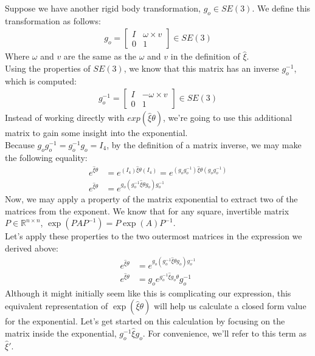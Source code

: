\documentclass[oneside]{book}
\begin{document}
Suppose we have another rigid body transformation, $g_o \in SE(3)$. We define this transformation as follows:
\begin{align}
    g_o = 
    \begin{bmatrix}
    I & \omega\times v\\
    0 & 1
    \end{bmatrix} \in SE(3)
\end{align}
Where $\omega$ and $v$ are the same as the $\omega$ and $v$ in the definition of $\hat\xi$.\\
Using the properties of $SE(3)$, we know that this matrix has an inverse $g_o^{-1}$, which is computed:
\begin{align}
    g_o^{-1} = 
    \begin{bmatrix}
    I & -\omega\times v\\
    0 & 1
    \end{bmatrix} \in SE(3)
\end{align}
Instead of working directly with $exp(\hat\xi\theta)$, we're going to use this additional matrix to gain some insight into the exponential.\\
Because $g_o g_o^{-1} = g_o^{-1}g_o = I_4$, by the definition of a matrix inverse, we may make the following equality:
\begin{align}
    e^{\hat\xi\theta} &= e^{(I_4) \hat\xi\theta (I_4)} = e^{(g_o g_o^{-1}) \hat\xi\theta (g_o g_o^{-1})}\\
    e^{\hat\xi\theta} &= e^{g_o (g_o^{-1} \hat\xi\theta g_o) g_o^{-1}}
\end{align}
Now, we may apply a property of the matrix exponential to extract two of the matrices from the exponent. We know that for any square, invertible matrix $P \in \mathbb{R}^{n\times n}$, $\exp(PAP^{-1}) = P\exp(A)P^{-1}$.\\
Let's apply these properties to the two outermost matrices in the expression we derived above:
\begin{align}
    e^{\hat\xi\theta} &= e^{g_o (g_o^{-1} \hat\xi\theta g_o) g_o^{-1}}\\
    e^{\hat\xi\theta} &= g_o e^{g_o^{-1} \hat\xi g_o\theta}g_o^{-1}
\end{align}
Although it might initially seem like this is complicating our expression, this equivalent representation of $\exp(\hat\xi\theta)$ will help us calculate a closed form value for the exponential. Let's get started on this calculation by focusing on the matrix inside the exponential, $g_o^{-1} \hat\xi g_o$. For convenience, we'll refer to this term as $\hat\xi'$.\\
\end{document}

